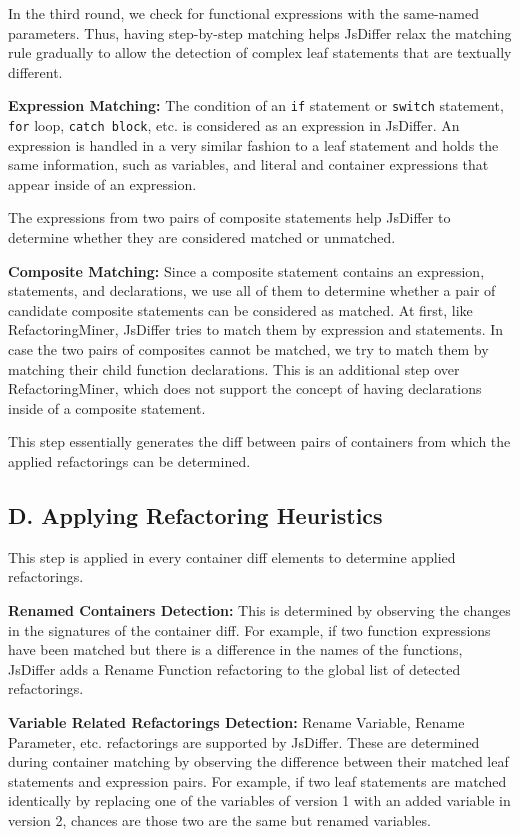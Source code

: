 \documentclass[letterpaper,12pt,onecolumn,final]{report}
\begin{document}
In the third round, we check for functional expressions with the same-named parameters. Thus, having step-by-step matching helps JsDiffer relax the matching rule gradually to allow the detection of complex leaf statements that are textually different.


\textbf{Expression Matching:} The condition of an \texttt{if} statement or \texttt{switch} statement, \texttt{for} loop, \texttt{catch block}, etc. is considered as an expression in JsDiffer. An expression is handled in a very similar fashion to a leaf statement and holds the same information, such as variables, and literal and container expressions that appear inside of an expression.

The expressions from two pairs of composite statements help JsDiffer to determine whether they are considered matched or unmatched.

\textbf{Composite Matching:} Since a composite statement contains an expression, statements, and declarations, we use all of them to determine whether a pair of candidate composite statements can be considered as matched. At first, like RefactoringMiner, JsDiffer tries to match them by expression and statements. In case the two pairs of composites cannot be matched, we try to match them by matching their child function declarations. This is an additional step over RefactoringMiner, which does not support the concept of having declarations inside of a composite statement.

This step essentially generates the diff between pairs of containers from which the applied refactorings can be determined.

\subsection *{D. Applying Refactoring Heuristics}
This step is applied in every container diff elements to determine applied refactorings.

\textbf{Renamed Containers Detection:} This is determined by observing the changes in the signatures of the container diff. For example, if two function expressions have been matched but there is a difference in the names of the functions, JsDiffer adds a Rename Function refactoring to the global list of detected refactorings.

\textbf{Variable Related Refactorings Detection:} Rename Variable, Rename Parameter, etc. refactorings are supported by JsDiffer. These are determined during container matching by observing the difference between their matched leaf statements and expression pairs. For example, if two leaf statements are matched identically by replacing one of the variables of version 1 with an added variable in version 2, chances are those two are the same but renamed variables.
\end{document}

